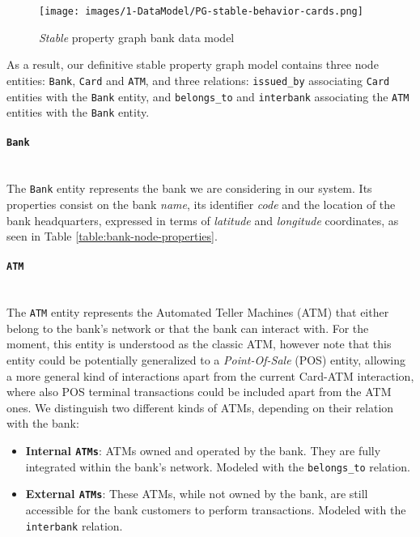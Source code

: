 \begin{figure}[H]
  \centering
  \texttt{[image: images/1-DataModel/PG-stable-behavior-cards.png]}
  \caption{\emph{Stable} property graph bank data model}
  \label{img:pg-stable-def}
\end{figure}

As a result, our definitive stable property graph model contains three node entities: \texttt{Bank}, \texttt{Card} and \texttt{ATM}, and three relations: \texttt{issued\_by} associating \texttt{Card} entities with the \texttt{Bank} entity, and \texttt{belongs\_to} and \texttt{interbank} associating the \texttt{ATM} entities with the \texttt{Bank} entity.\\

\paragraph{\texttt{Bank}\\\\}

The \texttt{Bank} entity represents the bank we are considering in our system. Its properties consist
on the bank \emph{name}, its identifier \emph{code} and the location
of the bank headquarters, expressed in terms of \emph{latitude} and \emph{longitude}
coordinates, as seen in Table \ref{table:bank-node-properties}.\\
  


\paragraph{\texttt{ATM}\\\\}

The \texttt{ATM} entity represents the Automated Teller Machines (ATM) that either belong to the bank's network or that the bank can interact with.
For the moment, this entity is understood as the classic ATM, however note that this entity could be potentially generalized to a \emph{Point-Of-Sale} (POS) entity, allowing a more general kind of interactions apart from the current Card-ATM interaction, where also POS terminal transactions could be included apart from the ATM ones. We distinguish two different kinds of ATMs, depending on their relation with the bank:
\begin{itemize}
  \item \textbf{Internal \texttt{ATMs}}: ATMs owned and operated by the bank. They are fully integrated within the
  bank's network. Modeled with the \texttt{belongs\_to} relation.
  \item \textbf{External \texttt{ATMs}}: These ATMs, while not owned by the bank, are still accessible for the bank
  customers to perform transactions. Modeled with the \texttt{interbank} relation. 
\end{itemize}


